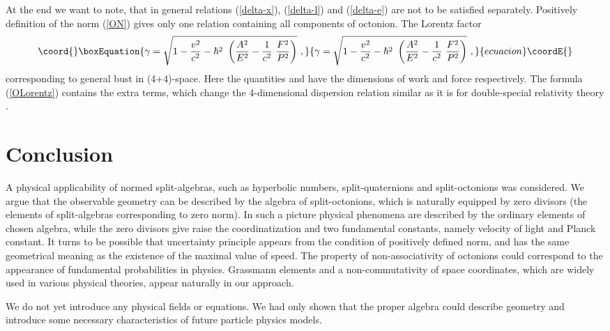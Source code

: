 \documentclass[a4paper,12pt]{article}
\begin{document}
At the end we want to note, that in general relations (\ref{delta-x}), (\ref{delta-l}) 
and (\ref{delta-e}) are not to be satisfied separately. Positively definition of the 
norm (\ref{ON}) gives only one relation containing all components of octonion. The 
Lorentz factor 
\begin{equation}\coord{}\boxEquation{ \label{OLorentz}
\gamma = \sqrt{1 - \frac{v^2}{c^2}  - \hbar^2 ~\left(\frac{A^2}{E^2} - \frac{1}{c^2}~ 
\frac{F^2}{P^2}\right) }~,
}{ \gamma = \sqrt{1 - \frac{v^2}{c^2}  - \hbar^2 ~\left(\frac{A^2}{E^2} - \frac{1}{c^2}~ 
\frac{F^2}{P^2}\right) }~,
}{ecuacion}\coordE{}\end{equation}
corresponding to general bust in (4+4)-space. Here the quantities \coordHE{} and \coordHE{} have 
the dimensions of work and force respectively. The formula (\ref{OLorentz}) contains 
the extra terms, which change the 4-dimensional dispersion relation similar as it is 
for double-special relativity theory \cite{double}. 


\section{Conclusion}

A physical applicability of normed split-algebras, such as hyperbolic numbers, 
split-quaternions and split-octonions was considered. We argue that the observable 
geometry can be described by the algebra of split-octonions, which is naturally 
equipped by zero divisors (the elements of split-algebras corresponding to zero norm). 
In such a picture physical phenomena are described by the ordinary elements of chosen 
algebra, while the zero divisors give raise the coordinatization and two fundamental 
constants, namely velocity of light and Planck constant. It turns to be possible that 
uncertainty principle appears from the condition of positively defined norm, and has 
the same geometrical meaning as the existence of the maximal value of speed. The 
property of non-associativity of octonions could correspond to the appearance of 
fundamental probabilities in physics. Grassmann elements and a non-commutativity of 
space coordinates, which are widely used in various physical theories, appear naturally 
in our approach. 

We do not yet introduce any physical fields or equations. We had only shown that the 
proper algebra could describe geometry and introduce some necessary characteristics 
of future particle physics models. 
\end{document}
